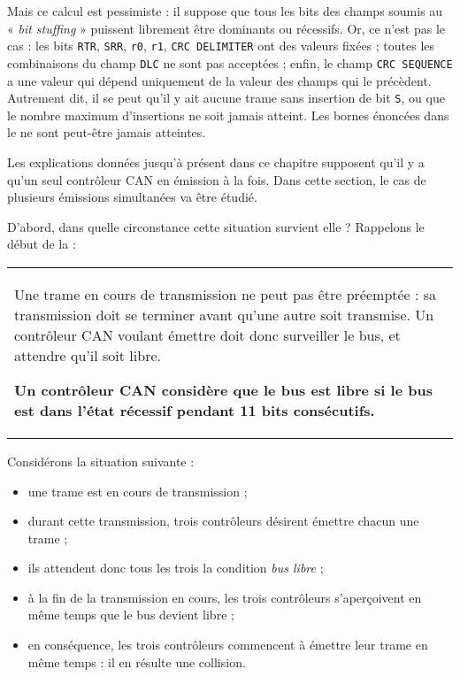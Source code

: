 Mais ce calcul est pessimiste : il suppose que tous les bits des champs soumis au « \emph{bit stuffing} » puissent librement être dominants ou récessifs. Or, ce n'est pas le cas : les bits \texttt{RTR}, \texttt{SRR}, \texttt{r0}, \texttt{r1}, \texttt{CRC DELIMITER} ont des valeurs fixées ; toutes les combinaisons du champ \texttt{DLC} ne sont pas acceptées ; enfin, le champ \texttt{CRC SEQUENCE} a une valeur qui dépend uniquement de la valeur des champs qui le précèdent. Autrement dit, il se peut qu'il y ait aucune trame sans insertion de bit \texttt{S}, ou que le nombre maximum d'insertions ne soit jamais atteint. Les bornes énoncées dans le  ne sont peut-être jamais atteintes.











Les explications données jusqu'à présent dans ce chapitre supposent qu'il y a qu'un seul contrôleur CAN en émission à la fois. Dans cette section, le cas de plusieurs émissions simultanées va être étudié.

D'abord, dans quelle circonstance cette situation survient elle ? Rappelons le début de la  :

\begin{tabular}{|l}
\begin{minipage}[flushright]{0.95\textwidth}
Une trame en cours de transmission ne peut pas être préemptée : sa transmission doit se terminer avant qu'une autre soit transmise. Un contrôleur CAN voulant émettre doit donc surveiller le bus, et attendre qu'il soit libre.

{\bf Un contrôleur CAN considère que le bus est libre si le bus est dans l’état récessif pendant 11 bits consécutifs.}
\end{minipage}
\end{tabular}


Considérons la situation suivante :
\begin{itemize}
  \item une trame est en cours de transmission ;
  \item durant cette transmission, trois contrôleurs désirent émettre chacun une trame ;
  \item ils attendent donc tous les trois la condition \emph{bus libre} ;
  \item à la fin de la transmission en cours, les trois contrôleurs s'aperçoivent en même temps que le bus devient libre ;
  \item en conséquence, les trois contrôleurs commencent à émettre leur trame en même temps : il en résulte une collision.
\end{itemize}


